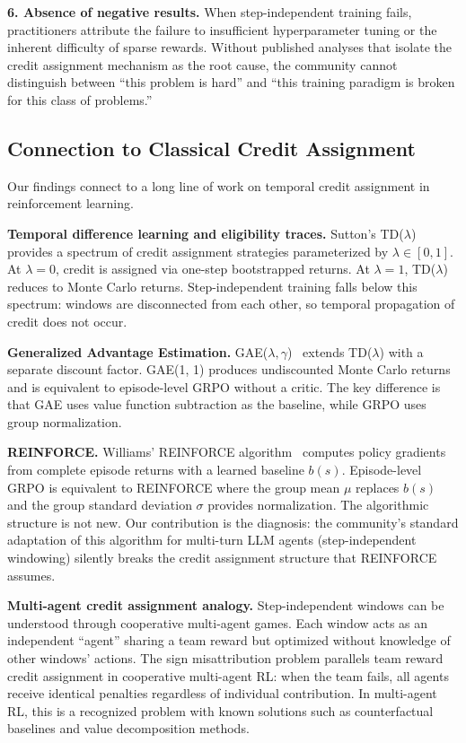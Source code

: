 \textbf{6. Absence of negative results.} When step-independent training fails, practitioners attribute the failure to insufficient hyperparameter tuning or the inherent difficulty of sparse rewards. Without published analyses that isolate the credit assignment mechanism as the root cause, the community cannot distinguish between ``this problem is hard'' and ``this training paradigm is broken for this class of problems.''

\subsection{Connection to Classical Credit Assignment}
\label{app:classical_connection}

Our findings connect to a long line of work on temporal credit assignment in reinforcement learning.

\textbf{Temporal difference learning and eligibility traces.} Sutton's TD($\lambda$)~\citep{sutton1988td} provides a spectrum of credit assignment strategies parameterized by $\lambda \in [0,1]$. At $\lambda = 0$, credit is assigned via one-step bootstrapped returns. At $\lambda = 1$, TD($\lambda$) reduces to Monte Carlo returns. Step-independent training falls below this spectrum: windows are disconnected from each other, so temporal propagation of credit does not occur.

\textbf{Generalized Advantage Estimation.} GAE($\lambda, \gamma$)~\citep{schulman2016gae} extends TD($\lambda$) with a separate discount factor. GAE(1, 1) produces undiscounted Monte Carlo returns and is equivalent to episode-level GRPO without a critic. The key difference is that GAE uses value function subtraction as the baseline, while GRPO uses group normalization.

\textbf{REINFORCE.} Williams' REINFORCE algorithm~\citep{williams1992reinforce} computes policy gradients from complete episode returns with a learned baseline $b(s)$. Episode-level GRPO is equivalent to REINFORCE where the group mean $\mu$ replaces $b(s)$ and the group standard deviation $\sigma$ provides normalization. The algorithmic structure is not new. Our contribution is the diagnosis: the community's standard adaptation of this algorithm for multi-turn LLM agents (step-independent windowing) silently breaks the credit assignment structure that REINFORCE assumes.

\textbf{Multi-agent credit assignment analogy.} Step-independent windows can be understood through cooperative multi-agent games. Each window acts as an independent ``agent'' sharing a team reward but optimized without knowledge of other windows' actions. The sign misattribution problem parallels team reward credit assignment in cooperative multi-agent RL: when the team fails, all agents receive identical penalties regardless of individual contribution. In multi-agent RL, this is a recognized problem with known solutions such as counterfactual baselines and value decomposition methods.

